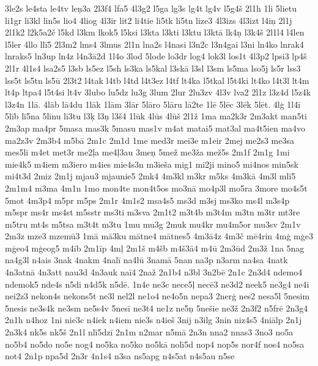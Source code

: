 {{3le2s le4sta le4tv le\c{n}3a 2l3f4 lfa5 4l3g2 l5ga lg3s lg4t lg4v
l5g4\v{s} 2l1h 1li 5lietu li1gr li3kl lin5s lio4 4liog 4l3ir lit2 li4tie
li5tk li5tn lize3 4l3izs 4l3izt l4i\c{n} 2l1j 2l1k2 l2k5a2\v{c}
l5kd l3km lkok5 l5ksi l3kta l3kti l3ktu l3kt\={a} lk4\c{n}
l3k4\v{s} 2l1l4 l4len l5ler 4llo ll\={i}5 2l3m2 lms4 3lmus 2l1n
lna2s l4nasi l3n2c l3n4gai l3ni ln4ko lnrak4 lnraks5 ln3up ln4z l4n3\={a}2d
1l4o 3lod 5lode lo3dr log4 lok3l los1t 4l3p2 lpsi3 lp4\v{s}
2l1r 4l1s4 lsa2s5 l3sb ls5ez l5sh ls3ka ls5kal l3sk\={a} l3sl
l3sm ls5ma lso5j ls5r lss3 lss5t ls5tn ls5\={u} 2l3t2 l4tak l4tb l4td
l4t3ez l4tf lt4ka l5tkal l5t4ki lt4ko l4t3l lt4m lt4p ltpa4 l5t4si
lt4v 3lubo lu5dz lu3g 3lum 2lur 2lu3zv 4l3v lva2 2l1z l3z4d l5z4k
l3z4n 1l\={a}. 4l\={a}b l\={a}4du 1l\={a}k 1l\={a}m 3l\={a}r 5l\={a}ro
5l\={a}ru l\={a}2te 1l\={e} 5l\={e}c 3l\={e}k 5l\={e}t. 4l\c{g}
1l4\={i} 5l\={i}b l\={i}5na 5l\={i}nu l\={i}3tu l3\c{k} l3\c{n}
l3\v{s}4 1l\={u}k 4l\={u}s 4l\={u}\v{s} 2l1\v{z} 1ma ma2k3r
2m3akt man5ti 2m3ap ma4pr 5masa mas3k 5masu mas1v m4at matai5 mat3al
ma4t5ien ma4vo ma2z3v 2m3b4 m5b\={a} 2m1c 2m1d 1me med3r mei3e m1eir
2mej me2s3 me3sa mes5li m4et met3r me2\c{l}a me4\c{l}3au 3me\c{n}
5me\v{z} me3\v{z}a me\v{z}5s 2m1f 2m1g 1mi mie4k5 m4iem m3iero
m4ies mie4s3n m3ie\v{s}a mig1 mi2ji mino5 mi4nos min5sk mi4t3d
2miz 2m1j mjau3 mjaunie5 2mk4 4m3kl m3kr m5ks 4m3k\={a} 4m3l ml\={i}5
2m1m4 m3ma 4m1n 1mo mon4te mon4t5os mo3n\={a} mo4p3l mo5ra 3more
mo4s5t 5mot 4m3p4 m5pr m5ps 2m1r 4m1s2 msa4s5 ms3d m3sj ms3ko ms4l
m3s4p m5spr ms4r ms4st m5sstr ms3ti m3sva 2m1t2 m3t4b m3t4m m3tn m3tr
mt3re m5tru mt4s m5tsa m3t4t m3tu 1mu mu3g 2muk mu4kr mu4m5or mu3sv
2m1v 2m3z mze3 mzem\={u}3 1m\={a} m\={a}3ku m\={a}tne4 m\={a}tnes5
4m3\={a}4z 4m3\v{c} m\={e}4rin 4m\c{g} m\c{g}e3 m\c{g}eo4
m\c{g}eog5 m4\={i}b 2m1\={i}p 4m\c{l} 2m1\v{s} m4\v{s}b m4\v{s}3\={a}4
m4\={u} 2m3\={u}d 2m3\v{z} 1na 5nag na4g3l n4ais 3nak
4nakm 4nal\={i} na4l\={u} 3nam\={a} 5nan na3p n3arm na4sa 4natk 4n3atn\={a}
4n3att nau3d 4n3auk na\={i}4 2na\v{z} 2n1b4 n3bl 3n2b\={e}
2n1c 2n3d4 ndemo4 ndemok5 nde4s n5di n4d5k n5d\={e}. 1n4e ne3c
nece5\c{l} nec\={e}3 ne3d2 neek5 ne3g4 ne4i nei2z3 nekon4s nekons5t
ne3l nel2l ne1o4 ne4o5n nepa3 2ner\c{g} nes2 nesa5l 5nesim 5nesis
ne3s4k ne3sm ne5s4v 5nes\={i} ne3t4 ne1z ne5\c{n} 5ne\v{s}ie ne3\v{z}
2n3f2 n5fr\={e} 2n3g4 2n1h n4hoz 1ni nie3c n4iek n4iem nie3s n4ie\v{s}
3nij n3ilg 3nin niz4s5 4ni\={a}lp 2n1j 2n3k4 nk5s nk5\v{s} 2n1l
nl\={i}5dz\={i} 2n1m n2mar n5m\={a} 2n3n nna2 nnas3 3no3 no5a no5b4
no5do no5e nog4 no5ka no5ko no5k\={a} nol\={i}5d nop4 nop5s nor4f
nos4 no5sa not4 2n1p npa5d 2n3r 4n1s4 n3sa ns5apg n4s5at n4s5au n5se
}}
